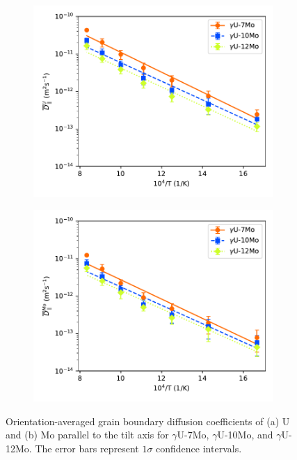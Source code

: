 \documentclass{elsarticle}
\begin{document}
\begin{figure}[!ht]
\begin{subfigure}{0.49\textwidth}
	\centering
	\caption{}
	\includegraphics[width=\textwidth]{comp_U_Dz.pdf}
\end{subfigure}
\begin{subfigure}{0.49\textwidth}
	\centering
	\caption{}
	\includegraphics[width=\textwidth]{comp_Mo_Dz.pdf}
\end{subfigure}
\caption{Orientation-averaged grain boundary diffusion coefficients of (a) U and (b) Mo parallel to the tilt axis for $\gamma$U-7Mo, $\gamma$U-10Mo, and $\gamma$U-12Mo. The error bars represent $1\sigma$ confidence intervals.}
\label{fig:comp}
\end{figure}
\end{document}
